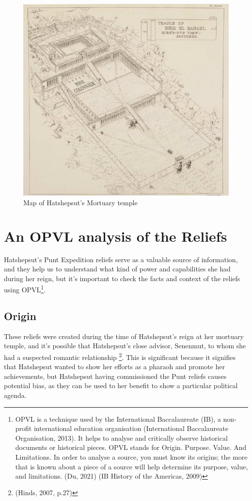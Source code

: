 \documentclass[12pt, letterpaper]{article}
\begin{document}
\begin{figure}
    \centering
    \includegraphics[width=1\linewidth]{img/map2.png}
    \caption{Map of Hatshepsut's Mortuary temple}
    \label{fig:enter-label}
\end{figure}
\newpage

\section*{An OPVL analysis of the Reliefs}
Hatshepsut's Punt Expedition reliefs serve as a valuable source of information, and they help us to understand what kind of power and capabilities she had during her reign, but it's important to check the facts and context of the reliefs using OPVL\footnote{OPVL is a technique used by the International Baccalaureate (IB), a non-profit international education organisation (International Baccalaureate Organisation, 2013). It helps to analyse and critically observe historical documents or historical pieces. OPVL stands for Origin. Purpose. Value. And Limitations. In order to analyse a source, you must know its origins; the more that is known about a piece of a source will help determine its purpose, value, and limitations. (Du, 2021) (IB History of the Americas, 2009)}.

\subsection*{Origin}
These reliefs were created during the time of Hatshepsut's reign at her mortuary temple, and it's possible that Hatshepsut's close advisor, Senenmut, to whom she had a suspected romantic relationship \footnote{(Hinds, 2007, p.27)}. This is significant because it signifies that Hatshepsut wanted to show her efforts as a pharaoh and promote her achievements, but Hatshepsut having commissioned the Punt reliefs causes potential bias, as they can be used to her benefit to show a particular political agenda.
\end{document}
